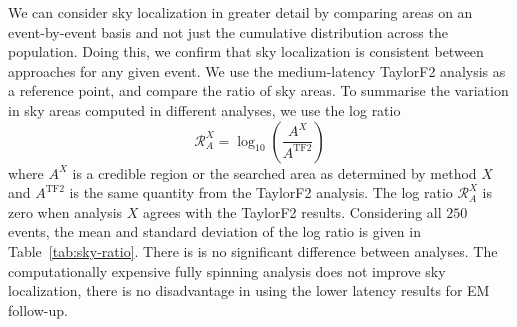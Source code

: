 We can consider sky localization in greater detail by comparing areas on an event-by-event basis and not just the cumulative distribution across the population. Doing this, we confirm that sky localization is consistent between approaches for any given event. We use the medium-latency TaylorF2 analysis as a reference point, and compare the ratio of sky areas. To summarise the variation in sky areas computed in different analyses, we use the log ratio
\begin{equation}
\mathcal{R}_A^X = \log_{10}\left(\frac{A^X}{A^\mathrm{TF2}}\right)
\end{equation}
where $A^X$ is a credible region or the searched area as determined by method $X$ and $A^\mathrm{TF2}$ is the same quantity from the TaylorF2 analysis. The log ratio $\mathcal{R}_A^X$ is zero when analysis $X$ agrees with the TaylorF2 results. Considering all $250$ events, the mean and standard deviation of the log ratio is given in Table~\ref{tab:sky-ratio}. There is is no significant difference between analyses. The computationally expensive fully spinning analysis does not improve sky localization, there is no disadvantage in using the lower latency results for EM follow-up.